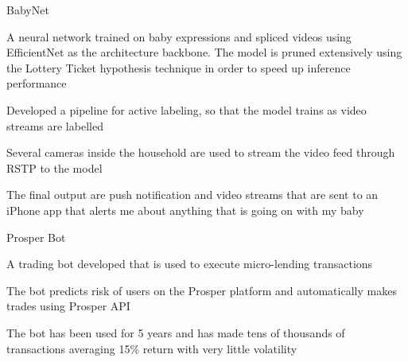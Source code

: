 
\begin{cventries}
  \cventry
    {} %
    {BabyNet} %
    {} %
    {} %
    {
      \begin{cvitems} %
        \item {A neural network trained on baby expressions and spliced videos using EfficientNet as the architecture backbone. The model is pruned extensively using the Lottery Ticket hypothesis technique in order to speed up inference performance}
        \item {Developed a pipeline for active labeling, so that the model trains as video streams are labelled}
		\item {Several cameras inside the household are used to stream the video feed through RSTP to the model}
		\item {The final output are push notification and video streams that are sent to an iPhone app that alerts me about anything that is going on with my baby}
      \end{cvitems}
    }

  \cventry
    {} %
    {Prosper Bot} %
    {} %
    {} %
    {
      \begin{cvitems} %
      	\item {A trading bot developed that is used to execute micro-lending transactions}
		\item {The bot predicts risk of users on the Prosper platform and automatically makes trades using Prosper API}
		\item {The bot has been used for 5 years and has made tens of thousands of transactions averaging 15\% return with very little volatility}
      \end{cvitems}
    }
\end{cventries}
